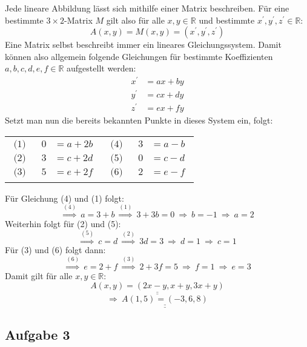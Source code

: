 \documentclass[10pt, a4paper]{article}
\begin{document}
		Jede lineare Abbildung lässt sich mithilfe einer Matrix beschreiben. Für eine bestimmte $3\times 2$-Matrix $M$ gilt also für alle $x,y\in \mathbb{R}$ und bestimmte $x^\prime,y^\prime,z^\prime \in \mathbb{R}$:
		\[
			A(x,y) = M(x,y) = (x^\prime, y^\prime, z^\prime)
		\]
		Eine Matrix selbst beschreibt immer ein lineares Gleichungssystem. Damit können also allgemein folgende Gleichungen für bestimmte Koeffizienten $a,b,c,d,e,f \in \mathbb{R}$ aufgestellt werden:
		\begin{align*}
			x^\prime &= ax + by \\
			y^\prime &= cx + dy \\
			z^\prime &= ex + fy
		\end{align*}
		Setzt man nun die bereits bekannten Punkte in dieses System ein, folgt:

		\begin{table}[h]
			\center
			\begin{tabular}{cc}
				$\begin{aligned}
					\text{(1)}& &0 &= a + 2b \\
					\text{(2)}& &3 &= c + 2d \\
					\text{(3)}& &5 &= e + 2f
				\end{aligned}$
				& 
				$\begin{aligned}
					\text{(4)}& &3 &= a - b \\
					\text{(5)}& &0 &= c - d \\
					\text{(6)}& &2 &= e - f
				\end{aligned}$ 
			\end{tabular}
		\end{table}

		Für Gleichung (4) und (1) folgt:
		\[
			\stackrel{(4)}{\Rightarrow} \ a = 3+b \ \stackrel{(1)}{\Rightarrow} \ 3+3b=0 \ \Rightarrow \ b = -1 \ \Rightarrow \ a = 2
		\]
		Weiterhin folgt für (2) und (5):
		\[
			\stackrel{(5)}{\Rightarrow} \ c = d \ \stackrel{(2)}{\Rightarrow} \ 3d = 3 \ \Rightarrow \ d = 1 \ \Rightarrow \ c = 1
		\]
		Für (3) und (6) folgt dann:
		\[
			\stackrel{(6)}{\Rightarrow} \ e = 2+f \ \stackrel{(3)}{\Rightarrow} \ 2+3f=5 \ \Rightarrow \ f = 1 \ \Rightarrow \ e = 3
		\]
		Damit gilt für alle $x,y \in \mathbb{R}$:
		\[
			\underline{\underline{A(x,y) = (2x-y, x+y, 3x+y)}}
		\]
		\[
			\Rightarrow \ \underline{\underline{A(1,5) = (-3,6,8)}}
		\]


	\newpage

	\subsection*{Aufgabe 3} %
	\label{sub:aufgabe_3}
	
\end{document}

